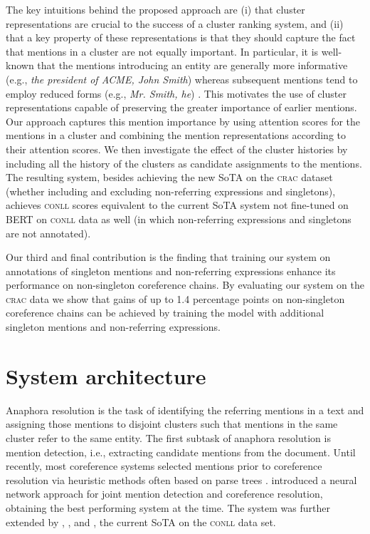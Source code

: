 \documentclass[10pt, a4paper]{article}
\newcommand{\ACRO}[1]{\textsc{#1}}
\newcommand{\CONLL}{\ACRO{conll}}
\newcommand{\CRAC}{\ACRO{crac}}
\begin{document}
The key intuitions behind the proposed approach are (i) that cluster representations are crucial to the success of a cluster ranking system, and (ii) that a key property of these representations is that they should capture the fact that mentions in a cluster are not equally important. In particular, it is well-known that the mentions introducing an entity are generally more informative (e.g., \textit{the president of ACME, John Smith}) whereas subsequent mentions tend to employ reduced forms (e.g., \textit{Mr. Smith, he}) \cite{ariel:90}. This motivates the use of cluster representations capable of preserving the greater importance of earlier mentions. 
Our approach captures this mention importance by using attention scores for the mentions in a cluster and combining the mention representations according to their attention scores. We then investigate the effect of the cluster histories by including all the history of the clusters as candidate assignments to the mentions. 
The resulting system, besides achieving the new SoTA on the {\CRAC} dataset (whether including and excluding non-referring expressions and singletons),
achieves {\CONLL} scores equivalent to the current SoTA system not fine-tuned on BERT \cite{kantor2019bertee} on {\CONLL} data as well (in which non-referring expressions and singletons are not annotated).

Our third and final contribution is the finding that training 
our system
on annotations of singleton mentions and non-referring expressions 
enhance its performance on non-singleton coreference chains. 
By evaluating our system on the {\CRAC} data we show that gains of up to 1.4 percentage points on non-singleton coreference chains can be achieved by training the model with additional singleton mentions and non-referring expressions.


\section{System architecture}
Anaphora 
resolution is the task of identifying the referring mentions in a text and assigning those mentions to disjoint clusters such that mentions in the same cluster refer to the same entity. 
The first subtask of anaphora resolution is  mention detection, i.e., extracting candidate mentions from the document. 
Until recently, 
most  coreference systems 
selected mentions 
prior to coreference resolution 
via heuristic methods
often
based on parse trees \cite{bjorkelund2014learning,clark2015entity,clark2016deep,clark2016improving,wiseman2015learning,wiseman2016learning}.   introduced a neural network approach for joint mention detection and coreference resolution, obtaining the best performing system at the time. 
The system was further extended by , , 
 and , the current SoTA on the {\CONLL} data set.
\end{document}
